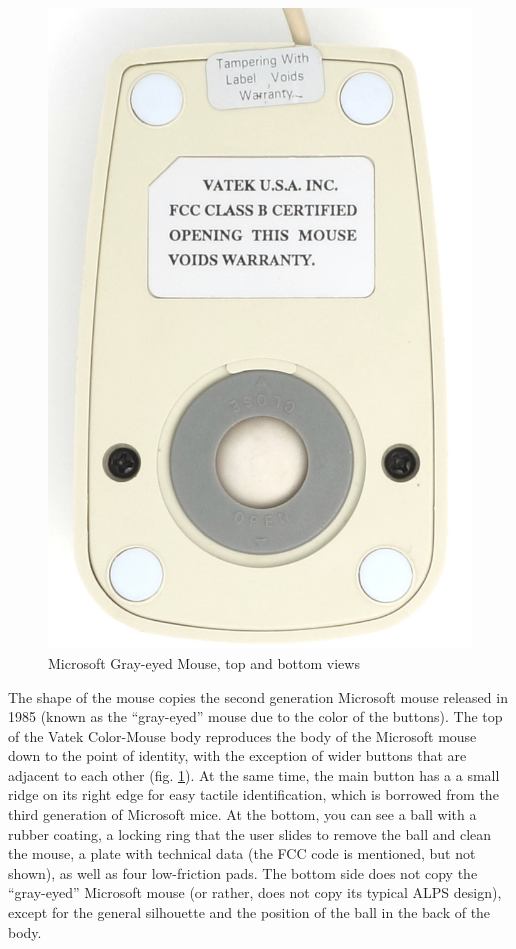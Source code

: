 \documentclass[11pt, a4paper]{article}
\begin{document}
\begin{figure}[h]
    \includegraphics[scale=0.55]{1989_vatek_color_mouse/bottom_30.jpg}
    \caption{Microsoft Gray-eyed Mouse, top and bottom views}
    \label{fig:VatekColorTopAndBottom}
\end{figure}

The shape of the mouse copies the second generation Microsoft mouse released in 1985 (known as the ``gray-eyed'' mouse due to the color of the buttons). The top of the Vatek Color-Mouse body reproduces the body of the Microsoft mouse down to the point of identity, with the exception of wider buttons that are adjacent to each other (fig. \ref{fig:VatekColorTopAndBottom}). At the same time, the main button has a a small ridge on its right edge for easy tactile identification, which is borrowed from the third generation of Microsoft mice.
At the bottom, you can see a ball with a rubber coating, a locking ring that the user slides to remove the ball and clean the mouse, a plate with technical data (the FCC code is mentioned, but not shown), as well as four low-friction pads. The bottom side does not copy the ``gray-eyed'' Microsoft mouse (or rather, does not copy its typical ALPS design), except for the general silhouette and the position of the ball in the back of the body.
\end{document}
